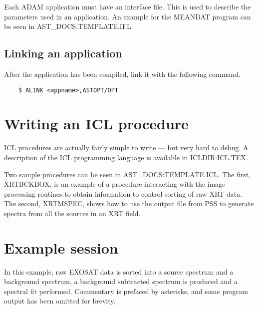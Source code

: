 Each ADAM application must have an interface file. This is used to describe
the parameters used in an application. An example for the MEANDAT program
can be seen in AST\_DOCS:TEMPLATE.IFL
 
\subsection{Linking an application }

After the application has been compiled, link it with the following command.
\begin{verbatim}
    $ ALINK <appname>,ASTOPT/OPT
\end{verbatim}

\section{Writing an ICL procedure }

ICL procedures are actually fairly simple to write --- but very hard to
debug. A description of the ICL programming language is available
in ICLDIR:ICL.TEX.

Two sample procedures can be seen in AST\_DOCS:TEMPLATE.ICL. The first,
XRTBCKBOX, is an example of a procedure interacting with the image
processing routines to obtain information to control sorting of raw
XRT data. The second, XRTMSPEC, shows how to use the output file from 
PSS to generate spectra from all the sources in an XRT field.

\newpage

\appendix

\section{Example session }

In this example, raw EXOSAT data is sorted into a source spectrum and a
background spectrum, a background subtracted spectrum is produced and a
spectral fit performed. Commentary is prefaced by asterisks, and some
program output has been omitted for brevity.

